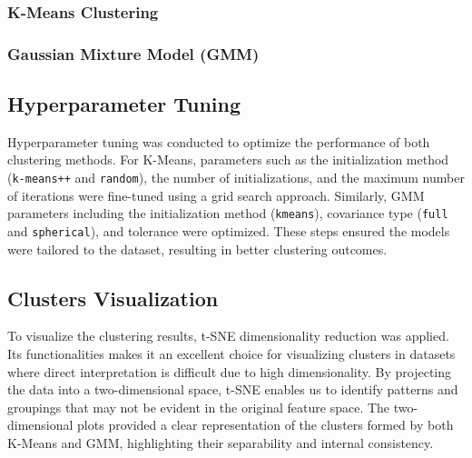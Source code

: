         \subsubsection{K-Means Clustering \\}
        
        
        \subsubsection{Gaussian Mixture Model (GMM) \\}
        

    \subsection{Hyperparameter Tuning}
    
        Hyperparameter tuning was conducted to optimize the performance of both clustering methods. For K-Means, parameters such as the initialization method (\texttt{k-means++} and \texttt{random}), the number of initializations, and the maximum number of iterations were fine-tuned using a grid search approach. Similarly, GMM parameters including the initialization method (\texttt{kmeans}), covariance type (\texttt{full} and \texttt{spherical}), and tolerance were optimized. These steps ensured the models were tailored to the dataset, resulting in better clustering outcomes.

    \subsection{Clusters Visualization}
    
        To visualize the clustering results, t-SNE dimensionality reduction was applied. Its functionalities makes it an excellent choice for visualizing clusters in datasets where direct interpretation is difficult due to high dimensionality. By projecting the data into a two-dimensional space, t-SNE enables us to identify patterns and groupings that may not be evident in the original feature space. The two-dimensional plots provided a clear representation of the clusters formed by both K-Means and GMM, highlighting their separability and internal consistency.
        
